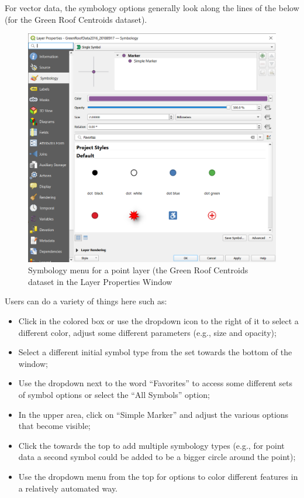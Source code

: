 \documentclass[
  letterpaper,
  DIV=11,
  numbers=noendperiod]{scrreprt}
\providecommand{\tightlist}{%
  \setlength{\itemsep}{0pt}\setlength{\parskip}{0pt}}\usepackage{longtable,booktabs,array}
\begin{document}
For vector data, the symbology options generally look along the lines of
the below (for the Green Roof Centroids dataset).

\begin{figure}

{\centering \includegraphics{./images/point_symbology_1.png}

}

\caption{Symbology menu for a point layer (the Green Roof Centroids
dataset in the Layer Properties Window}

\end{figure}

Users can do a variety of things here such as:

\begin{itemize}
\tightlist
\item
  Click in the colored box or use the dropdown icon to the right of it
  to select a different color, adjust some different parameters (e.g.,
  size and opacity);
\item
  Select a different initial symbol type from the set towards the bottom
  of the window;
\item
  Use the dropdown next to the word ``Favorites'' to access some
  different sets of symbol options or select the ``All Symbols'' option;
\item
  In the upper area, click on ``Simple Marker'' and adjust the various
  options that become visible;
\item
  Click the  towards the
  top to add multiple symbology types (e.g., for point data a second
  symbol could be added to be a bigger circle around the point);
\item
  Use the dropdown menu from the top for options to color different
  features in a relatively automated way.
\end{itemize}
\end{document}
